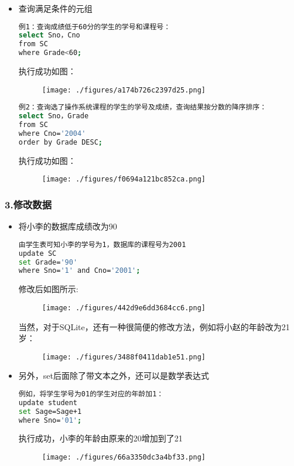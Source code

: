 \begin{itemize}
\item 查询满足条件的元组
\begin{lstlisting}[language=bash]
例1：查询成绩低于60分的学生的学号和课程号：
select Sno，Cno
from SC
where Grade<60;
\end{lstlisting}
执行成功如图：
\begin{figure}[ht]
\centering
\texttt{[image: ./figures/a174b726c2397d25.png]}
\caption{} \label{fig_SQLint_22}
\end{figure}
\begin{lstlisting}[language=bash]
例2：查询选了操作系统课程的学生的学号及成绩，查询结果按分数的降序排序：
select Sno，Grade
from SC
where Cno='2004'
order by Grade DESC;
\end{lstlisting}
执行成功如图：
\begin{figure}[ht]
\centering
\texttt{[image: ./figures/f0694a121bc852ca.png]}
\caption{} \label{fig_SQLint_23}
\end{figure}
\end{itemize}


\subsubsection{3.修改数据}

\begin{itemize}
\item 将小李的数据库成绩改为90
\begin{lstlisting}[language=bash]
由学生表可知小李的学号为1，数据库的课程号为2001
update SC
set Grade='90'
where Sno='1' and Cno='2001';
\end{lstlisting}
修改后如图所示:
\begin{figure}[ht]
\centering
\texttt{[image: ./figures/442d9e6dd3684cc6.png]}
\caption{} \label{fig_SQLint_15}
\end{figure}
当然，对于SQLite，还有一种很简便的修改方法，例如将小赵的年龄改为21岁：
\begin{figure}[ht]
\centering
\texttt{[image: ./figures/3488f0411dab1e51.png]}
\caption{} \label{fig_SQLint_16}
\end{figure}
\end{itemize}
\begin{itemize}
\item 另外，set后面除了带文本之外，还可以是数学表达式
\begin{lstlisting}[language=bash]
例如，将学生学号为01的学生对应的年龄加1：
update student
set Sage=Sage+1
where Sno='01';
\end{lstlisting}
执行成功，小李的年龄由原来的20增加到了21
\begin{figure}[ht]
\centering
\texttt{[image: ./figures/66a3350dc3a4bf33.png]}
\caption{} \label{fig_SQLint_24}
\end{figure}
\end{itemize}



